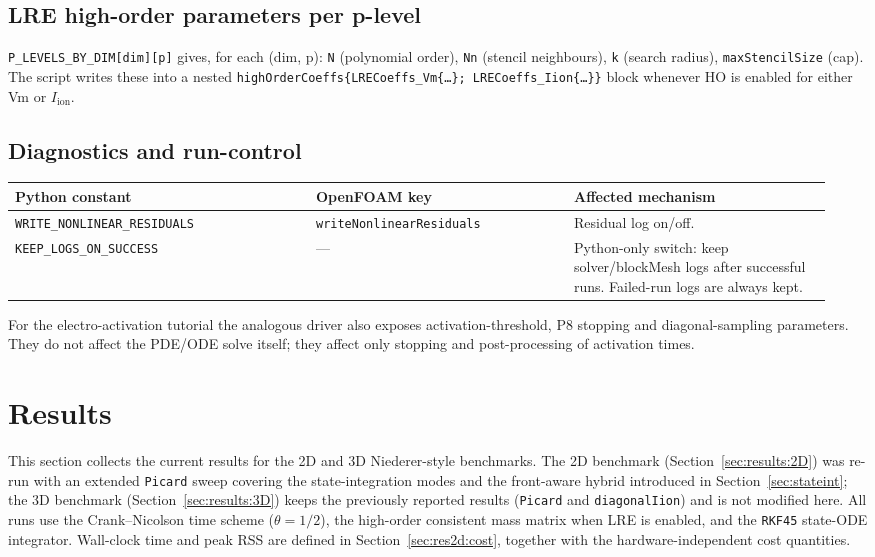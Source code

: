 \documentclass[11pt,a4paper]{article}
\newcommand{\code}[1]{\texttt{\small #1}}
\newcommand{\Iion}{I_{\mathrm{ion}}}
\begin{document}
\subsection{LRE high-order parameters per p-level}
\code{P\_LEVELS\_BY\_DIM[dim][p]} gives, for each (dim, p):
\code{N} (polynomial order), \code{Nn} (stencil neighbours),
\code{k} (search radius), \code{maxStencilSize} (cap). The script
writes these into a nested
\code{highOrderCoeffs\{LRECoeffs\_Vm\{\dots\}; LRECoeffs\_Iion\{\dots\}\}}
block whenever HO is enabled for either Vm or $\Iion$.

\subsection{Diagnostics and run-control}
\begin{longtable}{@{}p{0.35\linewidth}p{0.30\linewidth}p{0.30\linewidth}@{}}
\toprule
Python constant & OpenFOAM key & Affected mechanism \\
\midrule \endhead
\code{WRITE\_NONLINEAR\_RESIDUALS} &
   \code{writeNonlinearResiduals} & Residual log on/off. \\
\code{KEEP\_LOGS\_ON\_SUCCESS} & --- &
   Python-only switch: keep solver/blockMesh logs after successful runs.
   Failed-run logs are always kept. \\
\bottomrule
\end{longtable}

For the electro-activation tutorial the analogous driver also exposes
activation-threshold, P8 stopping and diagonal-sampling parameters. They
do not affect the PDE/ODE solve itself; they affect only stopping and
post-processing of activation times.

\section{Results}
\label{sec:results}

This section collects the current results for the 2D and 3D
Niederer-style benchmarks. The 2D benchmark (Section~\ref{sec:results:2D}) was re-run
with an extended \code{Picard} sweep covering the state-integration modes and
the front-aware hybrid introduced in
Section~\ref{sec:stateint}; the 3D benchmark (Section~\ref{sec:results:3D}) keeps
the previously reported results (\code{Picard} and \code{diagonalIion}) and is not
modified here. All runs use the Crank--Nicolson time scheme
($\theta = 1/2$), the high-order consistent mass matrix when LRE is
enabled, and the \code{RKF45} state-ODE integrator. Wall-clock time
and peak RSS are defined in Section~\ref{sec:res2d:cost}, together
with the hardware-independent cost quantities.
\end{document}

